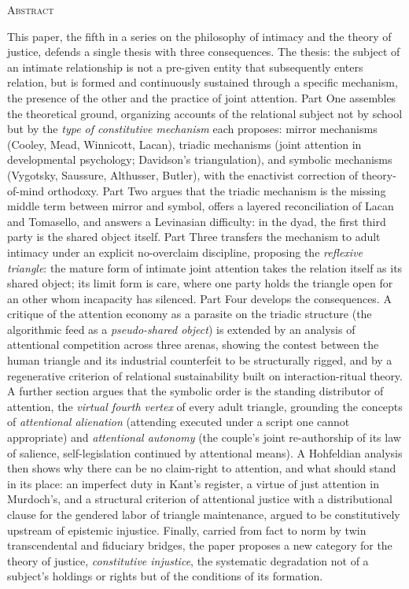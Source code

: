 \documentclass[11pt,a4paper]{article}
\theoremstyle{seriesthm}
\begin{document}
\begin{titlepage}
\thispagestyle{empty}
\begin{center}
\begin{minipage}{0.92\textwidth}
\begin{center}{\footnotesize\color{ink}\scshape Abstract}\end{center}
{\footnotesize
This paper, the fifth in a series on the philosophy of intimacy and the theory of justice, defends a single thesis with three consequences. The thesis: the subject of an intimate relationship is not a pre-given entity that subsequently enters relation, but is formed and continuously sustained through a specific mechanism, the presence of the other and the practice of joint attention. Part One assembles the theoretical ground, organizing accounts of the relational subject not by school but by the \emph{type of constitutive mechanism} each proposes: mirror mechanisms (Cooley, Mead, Winnicott, Lacan), triadic mechanisms (joint attention in developmental psychology; Davidson's triangulation), and symbolic mechanisms (Vygotsky, Saussure, Althusser, Butler), with the enactivist correction of theory-of-mind orthodoxy. Part Two argues that the triadic mechanism is the missing middle term between mirror and symbol, offers a layered reconciliation of Lacan and Tomasello, and answers a Levinasian difficulty: in the dyad, the first third party is the shared object itself. Part Three transfers the mechanism to adult intimacy under an explicit no-overclaim discipline, proposing the \emph{reflexive triangle}: the mature form of intimate joint attention takes the relation itself as its shared object; its limit form is care, where one party holds the triangle open for an other whom incapacity has silenced. Part Four develops the consequences. A critique of the attention economy as a parasite on the triadic structure (the algorithmic feed as a \emph{pseudo-shared object}) is extended by an analysis of attentional competition across three arenas, showing the contest between the human triangle and its industrial counterfeit to be structurally rigged, and by a regenerative criterion of relational sustainability built on interaction-ritual theory. A further section argues that the symbolic order is the standing distributor of attention, the \emph{virtual fourth vertex} of every adult triangle, grounding the concepts of \emph{attentional alienation} (attending executed under a script one cannot appropriate) and \emph{attentional autonomy} (the couple's joint re-authorship of its law of salience, self-legislation continued by attentional means). A Hohfeldian analysis then shows why there can be no claim-right to attention, and what should stand in its place: an imperfect duty in Kant's register, a virtue of just attention in Murdoch's, and a structural criterion of attentional justice with a distributional clause for the gendered labor of triangle maintenance, argued to be constitutively upstream of epistemic injustice. Finally, carried from fact to norm by twin transcendental and fiduciary bridges, the paper proposes a new category for the theory of justice, \emph{constitutive injustice}, the systematic degradation not of a subject's holdings or rights but of the conditions of its formation.
}
\end{minipage}
\end{center}
\end{titlepage}
\end{document}
